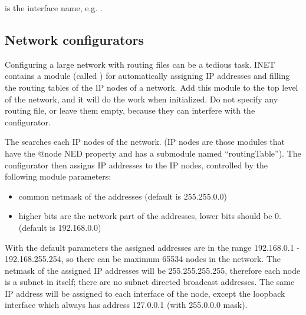  is the interface name, e.g. .


\subsection{Network configurators}

Configuring a large network with routing files can be a tedious task.
INET contains a module (called )
for automatically assigning IP addresses and filling the routing tables
of the IP nodes of a network. Add this module to the top level
of the network, and it will do the work when initialized. Do not
specify any routing file, or leave them empty, because they can
interfere with the configurator.

The  searches each IP nodes of the network.
(IP nodes are those modules that have the @node NED property and
has a  submodule named ``routingTable'').
The configurator then assigns IP addresses to the IP nodes, controlled
by the following module parameters:
\begin{itemize}
  \item {} common netmask of the addresses (default is 255.255.0.0)
  \item {} higher bits are the network part of the addresses,
        lower bits should be 0. (default is 192.168.0.0)
\end{itemize}

With the default parameters the assigned addresses are in the range
192.168.0.1 - 192.168.255.254, so there can be maximum 65534 nodes in the
network. The netmask of the assigned IP addresses will be 255.255.255.255,
therefore each node is a subnet in itself; there are no subnet directed
broadcast addresses. The same IP address will be assigned to each interface
of the node, except the loopback interface which always has address 127.0.0.1
(with 255.0.0.0 mask).

